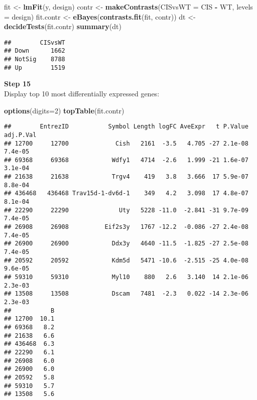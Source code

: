 \documentclass[]{book}
\newenvironment{Shaded}{\begin{snugshade}}{\end{snugshade}}
\newcommand{\DataTypeTok}[1]{\textcolor[rgb]{0.13,0.29,0.53}{#1}}
\newcommand{\DecValTok}[1]{\textcolor[rgb]{0.00,0.00,0.81}{#1}}
\newcommand{\KeywordTok}[1]{\textcolor[rgb]{0.13,0.29,0.53}{\textbf{#1}}}
\newcommand{\NormalTok}[1]{#1}
\newcommand{\OperatorTok}[1]{\textcolor[rgb]{0.81,0.36,0.00}{\textbf{#1}}}
\newcommand{\StringTok}[1]{\textcolor[rgb]{0.31,0.60,0.02}{#1}}
\begin{document}
\begin{Shaded}
\begin{Highlighting}[]
\NormalTok{fit <-}\StringTok{ }\KeywordTok{lmFit}\NormalTok{(y, design)}
\NormalTok{contr <-}\StringTok{ }\KeywordTok{makeContrasts}\NormalTok{(}\DataTypeTok{CISvsWT =}\NormalTok{ CIS }\OperatorTok{-}\StringTok{ }\NormalTok{WT, }\DataTypeTok{levels =}\NormalTok{ design)}
\NormalTok{fit.contr <-}\StringTok{ }\KeywordTok{eBayes}\NormalTok{(}\KeywordTok{contrasts.fit}\NormalTok{(fit, contr))}
\NormalTok{dt <-}\StringTok{ }\KeywordTok{decideTests}\NormalTok{(fit.contr)}
\KeywordTok{summary}\NormalTok{(dt)}
\end{Highlighting}
\end{Shaded}

\begin{verbatim}
##        CISvsWT
## Down      1662
## NotSig    8788
## Up        1519
\end{verbatim}

\textbf{Step 15}\\

Display top 10 most differentially expressed genes:

\begin{Shaded}
\begin{Highlighting}[]
\KeywordTok{options}\NormalTok{(}\DataTypeTok{digits=}\DecValTok{2}\NormalTok{)}
\KeywordTok{topTable}\NormalTok{(fit.contr)}
\end{Highlighting}
\end{Shaded}

\begin{verbatim}
##        EntrezID           Symbol Length logFC AveExpr   t P.Value adj.P.Val
## 12700     12700             Cish   2161  -3.5   4.705 -27 2.1e-08   7.4e-05
## 69368     69368            Wdfy1   4714  -2.6   1.999 -21 1.6e-07   3.1e-04
## 21638     21638            Trgv4    419   3.8   3.666  17 5.9e-07   8.8e-04
## 436468   436468 Trav15d-1-dv6d-1    349   4.2   3.098  17 4.8e-07   8.1e-04
## 22290     22290              Uty   5228 -11.0  -2.841 -31 9.7e-09   7.4e-05
## 26908     26908          Eif2s3y   1767 -12.2  -0.086 -27 2.4e-08   7.4e-05
## 26900     26900            Ddx3y   4640 -11.5  -1.825 -27 2.5e-08   7.4e-05
## 20592     20592            Kdm5d   5471 -10.6  -2.515 -25 4.0e-08   9.6e-05
## 59310     59310            Myl10    880   2.6   3.140  14 2.1e-06   2.3e-03
## 13508     13508            Dscam   7481  -2.3   0.022 -14 2.3e-06   2.3e-03
##           B
## 12700  10.1
## 69368   8.2
## 21638   6.6
## 436468  6.3
## 22290   6.1
## 26908   6.0
## 26900   6.0
## 20592   5.8
## 59310   5.7
## 13508   5.6
\end{verbatim}
\end{document}
